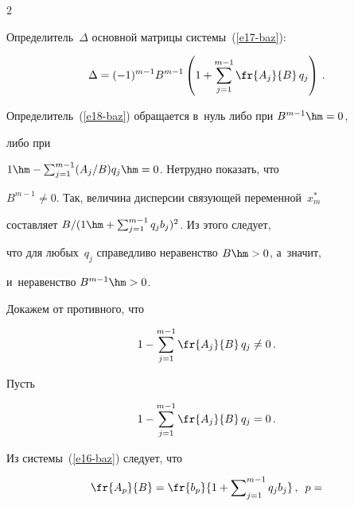 \begin{multicols}{2}


    Определитель~$\Delta$ основной матрицы системы~(\ref{e17-baz}):


    \begin{equation}


    \Delta =(-1)^{m-1} B^{m-1}\left( 1+\sum\limits_{j=1}^{m-1} 


\fr{A_j}{B}\,q_j\right)\,.


    \label{e18-baz}


    \end{equation}


    


Определитель~(\ref{e18-baz}) обращается в~нуль либо при $B^{m-1}\hm=0$, 


либо при


$1\hm- \sum\nolimits_{j=1}^{m-1}(A_j/B)q_j\hm=0$. Нетрудно показать, что  


$B^{m-1}\not= 0$. Так, величина дисперсии связующей переменной~$x_m^*$ 


составляет $B/(1\hm+ \sum\nolimits^{m-1}_{j=1} q_j b_j)^2$. Из этого следует, 


что для любых~$q_j$ справедливо неравенство $B\hm>0$, а~значит, 


и~неравенство $B^{m-1}\hm>0$.


    


    Докажем от противного, что 


    $$


    1- \sum\limits_{j=1}^{m-1}\fr{A_j}{B}\,q_j 


\not= 0\,.


$$





 Пусть


    \begin{equation}


1-\sum\limits_{j=1}^{m-1}\fr{A_j}{B}\,q_j=0\,.


\label{e19-baz}


\end{equation}




    Из системы~(\ref{e16-baz}) следует, что


    \begin{equation}


    \fr{A_p}{B}= \fr{b_p}{1+\sum\nolimits_{j=1}^{m-1} q_j b_j}\,,\enskip p= 



\end{equation}
\end{multicols}
